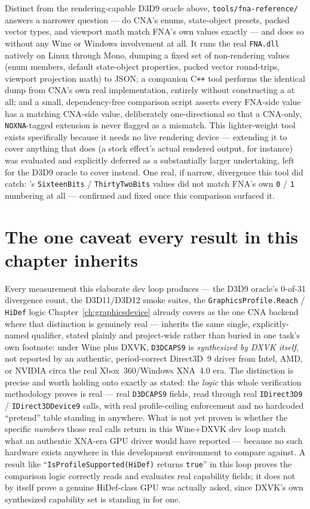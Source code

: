 Distinct from the rendering-capable D3D9 oracle above, \texttt{tools/fna-reference/} answers
a narrower question --- do CNA's enums, state-object presets, packed vector types, and
viewport math match FNA's own values exactly --- and does so without any Wine or Windows
involvement at all. It runs the real \texttt{FNA.dll} natively on Linux through Mono, dumping
a fixed set of non-rendering values (enum members, default state-object properties, packed
vector round-trips, viewport projection math) to JSON; a companion C\texttt{++} tool performs
the identical dump from CNA's own real implementation, entirely without constructing a
 at all; and a small, dependency-free comparison script asserts every
FNA-side value has a matching CNA-side value, deliberately one-directional so that a
CNA-only, \texttt{NOXNA}-tagged extension is never flagged as a mismatch. This lighter-weight
tool exists specifically because it needs no live rendering device --- extending it to cover
anything that does (a stock effect's actual rendered output, for instance) was evaluated and
explicitly deferred as a substantially larger undertaking, left for the D3D9 oracle to cover
instead. One real, if narrow, divergence this tool did catch: 's
\texttt{SixteenBits} / \texttt{ThirtyTwoBits} values did not match FNA's own \texttt{0} / \texttt{1}
numbering at all --- confirmed and fixed once this comparison surfaced it.

\section{The one caveat every result in this chapter inherits}

Every measurement this elaborate dev loop produces --- the D3D9 oracle's 0-of-31 divergence
count, the D3D11/D3D12 smoke suites, the \texttt{GraphicsProfile.Reach} / \texttt{HiDef} logic
Chapter~\ref{ch:graphicsdevice} already covers as the one CNA backend where that distinction is
genuinely real --- inherits the same single, explicitly-named qualifier, stated plainly and
project-wide rather than buried in one task's own footnote: under Wine plus DXVK,
\texttt{D3DCAPS9} is \emph{synthesized by DXVK itself}, not reported by an authentic,
period-correct Direct3D~9 driver from Intel, AMD, or NVIDIA circa the real Xbox~360/Windows
XNA~4.0 era. The distinction is precise and worth holding onto exactly as stated: the
\emph{logic} this whole verification methodology proves is real --- real \texttt{D3DCAPS9}
fields, read through real \texttt{IDirect3D9} / \texttt{IDirect3DDevice9} calls, with real
profile-ceiling enforcement and no hardcoded ``pretend'' table standing in anywhere. What is
not yet proven is whether the specific \emph{numbers} those real calls return in this
Wine+DXVK dev loop match what an authentic XNA-era GPU driver would have reported --- because
no such hardware exists anywhere in this development environment to compare against. A result
like ``\texttt{IsProfileSupported(HiDef)} returns \texttt{true}'' in this loop proves the
comparison logic correctly reads and evaluates real capability fields; it does not by itself
prove a genuine HiDef-class GPU was actually asked, since DXVK's own synthesized capability set
is standing in for one.

